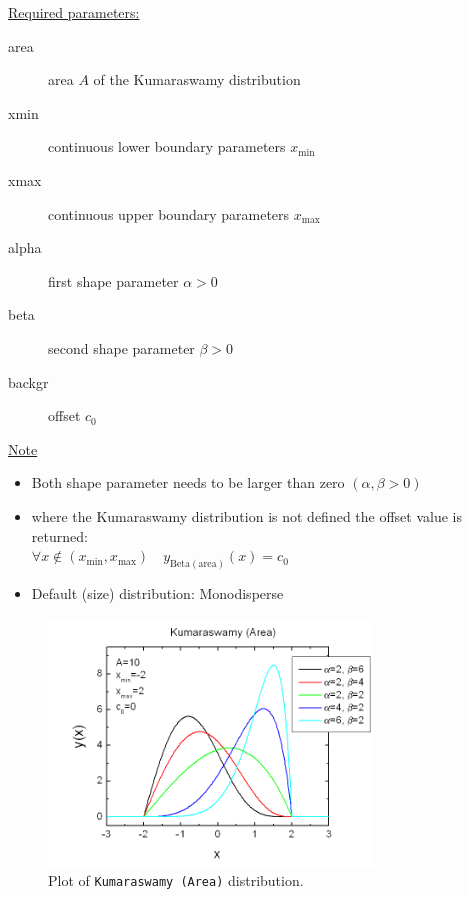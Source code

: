 \uline{Required parameters:}
\begin{description}
    \item[area] area $A$ of the Kumaraswamy distribution
    \item[xmin] continuous lower boundary parameters $x_\mathrm{min}$
    \item[xmax] continuous upper boundary parameters $x_\mathrm{max}$
    \item[alpha] first shape parameter $\alpha>0$
    \item[beta]  second shape parameter $\beta>0$
    \item[backgr] offset $c_0$
\end{description}

\uline{Note}
\begin{itemize}
  \item Both shape parameter needs to be larger than zero $(\alpha,\beta>0)$
  \item where the Kumaraswamy distribution is not defined the offset value is returned: \\
  $\forall x\notin (x_\mathrm{min},x_\mathrm{max})\quad y_\mathrm{Beta (area)}(x) = c_0$
  \item Default (size) distribution: Monodisperse
\end{itemize}

\begin{figure}[htb]
\begin{center}
\includegraphics[width=0.768\textwidth]{KumaraswamyArea.png}
\end{center}
\caption{Plot of \texttt{Kumaraswamy (Area)} distribution.}
\label{fig:KumaraswamyArea}
\end{figure}

\clearpage
